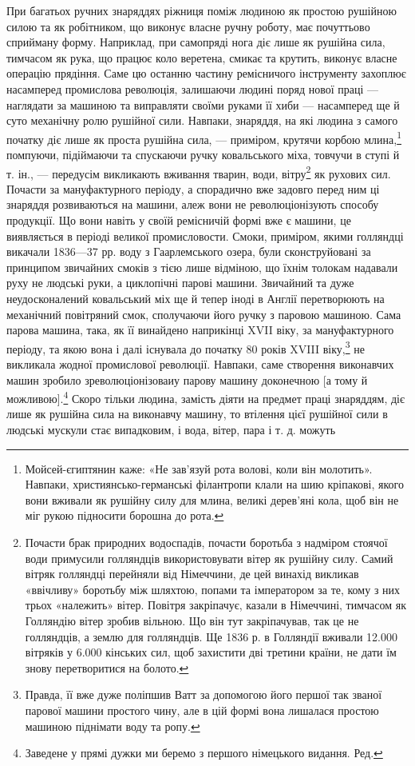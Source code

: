 При багатьох ручних знаряддях ріжниця поміж людиною як
простою рушійною силою та як робітником, що виконує власне
ручну роботу, має почуттьово сприйману форму. Наприклад,
при самопряді нога діє лише як рушійна сила, тимчасом як рука,
що працює коло веретена, смикає та крутить, виконує власне
операцію прядіння. Саме цю останню частину ремісничого інструменту
захоплює насамперед промислова революція, залишаючи
людині поряд нової праці — наглядати за машиною та виправляти
своїми руками її хиби — насамперед ще й суто механічну ролю
рушійної сили. Навпаки, знаряддя, на які людина з самого початку
діє лише як проста рушійна сила, — приміром, крутячи корбою
млина,\footnote{
Мойсей-єгиптянин каже: «Не зав’язуй рота волові, коли він молотить».
Навпаки, християнсько-германські філантропи клали на шию
кріпакові, якого вони вживали як рушійну силу для млина, великі дерев’яні
кола, щоб він не міг рукою підносити борошна до рота.
} помпуючи, підіймаючи та спускаючи ручку ковальського
міха, товчучи в ступі й т. ін., — передусім викликають вживання
тварин, води, вітру\footnote{
Почасти брак природних водоспадів, почасти боротьба з надміром
стоячої води примусили голляндців використовувати вітер як рушійну
силу. Самий вітряк голляндці перейняли від Німеччини, де цей винахід
викликав «ввічливу» боротьбу між шляхтою, попами та імператором за те,
кому з них трьох «належить» вітер. Повітря закріпачує, казали в Німеччині,
тимчасом як Голляндію вітер зробив вільною. Що він тут закріпачував,
так це не голляндців, а землю для голляндців. Ще 1836 р.
в Голляндії вживали 12.000 вітряків у 6.000 кінських сил, щоб захистити
дві третини країни, не дати їм знову перетворитися на болото.
} як рухових сил. Почасти за мануфактурного
періоду, а спорадично вже задовго перед ним ці знаряддя
розвиваються на машини, алеж вони не революціонізують способу
продукції. Що вони навіть у своїй ремісничій формі вже є
машини, це виявляється в періоді великої промисловости. Смоки,
приміром, якими голляндці викачали 1836—37 рр. воду з Гаарлемського
озера, були сконструйовані за принципом звичайних
смоків з тією лише відміною, що їхнім толокам надавали руху не
людські руки, а циклопічні парові машини. Звичайний та дуже
неудосконалений ковальський міх ще й тепер іноді в Англії перетворюють
на механічний повітряний смок, сполучаючи його
ручку з паровою машиною. Сама парова машина, така, як її
винайдено наприкінці XVII віку, за мануфактурного періоду,
та якою вона і далі існувала до початку 80 років XVIII віку,\footnote{
Правда, її вже дуже поліпшив Ватт за допомогою його першої
так званої парової машини простого чину, але в цій формі вона лишалася
простою машиною піднімати воду та ропу.
}
не викликала жодної промислової революції. Навпаки, саме створення
виконавчих машин зробило зреволюціонізоваиу парову
машину доконечною [а тому й можливою].\footnote*{
Заведене у прямі дужки ми беремо з першого німецького видання.
Ред.
} Скоро тільки людина,
замість діяти на предмет праці знаряддям, діє лише як рушійна
сила на виконавчу машину, то втілення цієї рушійної сили в
людські мускули стає випадковим, і вода, вітер, пара і т. д. можуть